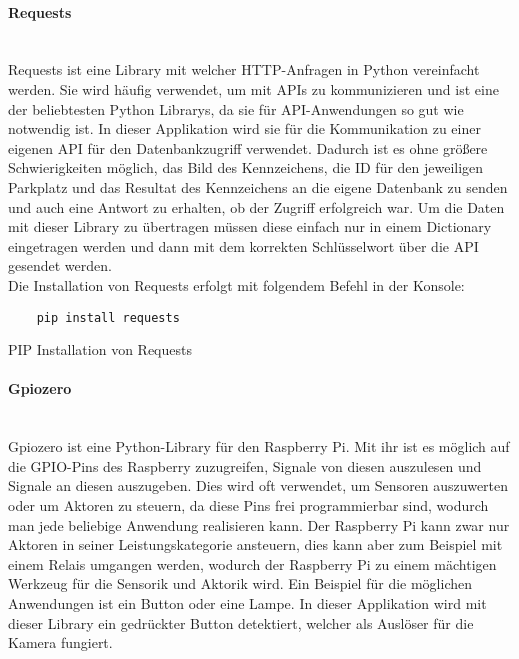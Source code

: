 \paragraph{Requests}\mbox{}\\
Requests ist eine Library mit welcher HTTP-Anfragen in Python vereinfacht werden. Sie wird häufig verwendet, um mit APIs zu kommunizieren 
und ist eine der beliebtesten Python Librarys, da sie für API-Anwendungen so gut wie notwendig ist. In dieser Applikation wird sie für die 
Kommunikation zu einer eigenen API für den Datenbankzugriff verwendet. Dadurch ist es ohne größere Schwierigkeiten möglich, das Bild des Kennzeichens, 
die ID für den jeweiligen Parkplatz und das Resultat des Kennzeichens an die eigene Datenbank zu senden und auch eine Antwort zu erhalten, ob der 
Zugriff erfolgreich war. Um die Daten mit dieser Library zu übertragen müssen diese einfach nur in einem Dictionary eingetragen werden und dann mit 
dem korrekten Schlüsselwort über die API gesendet werden.\\

Die Installation von Requests erfolgt mit folgendem Befehl in der Konsole:

\begin{listing}[H]
    \begin{verbatim}
    pip install requests
    \end{verbatim}
    \caption{PIP Installation von Requests}
\end{listing}

\paragraph{Gpiozero}\mbox{}\\
Gpiozero ist eine Python-Library für den Raspberry Pi. Mit ihr ist es möglich auf die GPIO-Pins des Raspberry zuzugreifen, Signale von diesen 
auszulesen und Signale an diesen auszugeben. Dies wird oft verwendet, um Sensoren auszuwerten oder um Aktoren zu steuern, da diese Pins frei 
programmierbar sind, wodurch man jede beliebige Anwendung realisieren kann. Der Raspberry Pi kann zwar nur Aktoren in seiner Leistungskategorie ansteuern, 
dies kann aber zum Beispiel mit einem Relais umgangen werden, wodurch der Raspberry Pi zu einem mächtigen Werkzeug für die Sensorik und Aktorik wird. 
Ein Beispiel für die möglichen Anwendungen ist ein Button oder eine Lampe. In dieser Applikation wird mit dieser Library ein gedrückter Button detektiert, 
welcher als Auslöser für die Kamera fungiert.\\

